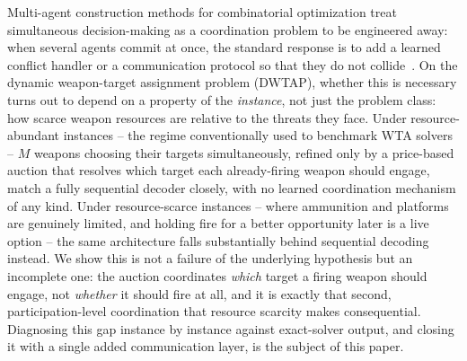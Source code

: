Multi-agent construction methods for combinatorial optimization treat simultaneous decision-making as a coordination problem to be engineered away: when several agents commit at once, the standard response is to add a learned conflict handler or a communication protocol so that they do not collide~\cite{parco2024,sukhbaatar2016commnet,das2019tarmac}. On the dynamic weapon-target assignment problem (DWTAP), whether this is necessary turns out to depend on a property of the \emph{instance}, not just the problem class: how scarce weapon resources are relative to the threats they face. Under resource-abundant instances -- the regime conventionally used to benchmark WTA solvers -- $M$ weapons choosing their targets simultaneously, refined only by a price-based auction that resolves which target each already-firing weapon should engage, match a fully sequential decoder closely, with no learned coordination mechanism of any kind. Under resource-scarce instances -- where ammunition and platforms are genuinely limited, and holding fire for a better opportunity later is a live option -- the same architecture falls substantially behind sequential decoding instead. We show this is not a failure of the underlying hypothesis but an incomplete one: the auction coordinates \emph{which} target a firing weapon should engage, not \emph{whether} it should fire at all, and it is exactly that second, participation-level coordination that resource scarcity makes consequential. Diagnosing this gap instance by instance against exact-solver output, and closing it with a single added communication layer, is the subject of this paper.

